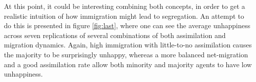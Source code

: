At this point, it could be interesting combining both concepts, in order to get a realistic intuition of how immigration might lead to segregation. An attempt to do this is presented in figure \ref{fig:last}, where one can see the average unhappiness across seven replications of several combinations of both assimilation and migration dynamics. Again, high immigration with little-to-no assimilation causes the majority to be surprisingly unhappy, whereas a more balanced net-migration and a good assimilation rate allow both minority and majority agents to have low unhappiness.
